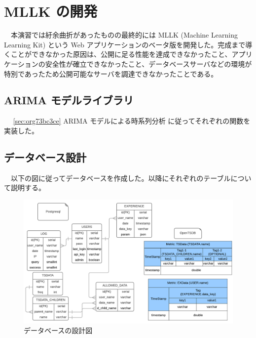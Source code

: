 \documentclass{scrartcl}
\begin{document}
\section{MLLK の開発}
\label{sec:orgd2d0c53}
　本演習では紆余曲折があったものの最終的には MLLK (Machine Learning Learning Kit) という Web アプリケーションのベータ版を開発した。完成まで導くことができなかった原因は、公開に足る性能を達成できなかったこと、アプリケーションの安全性が確立できなかったこと、データベースサーバなどの環境が特別であったため公開可能なサーバを調達できなかったことである。\\
\subsection{ARIMA モデルライブラリ}
\label{sec:org82b97e7}
　 \ref{sec:org73bc3ce} ARIMA モデルによる時系列分析 に従ってそれぞれの関数を実装した。\\
\subsection{データベース設計}
\label{sec:org0cfdbf3}
　以下の図に従ってデータベースを作成した。以降にそれぞれのテーブルについて説明する。\\
\begin{figure}[htbp]
\centering
\includegraphics[width=15cm]{./fool-diagram.png}
\caption{データベースの設計図}
\end{figure}
\end{document}

